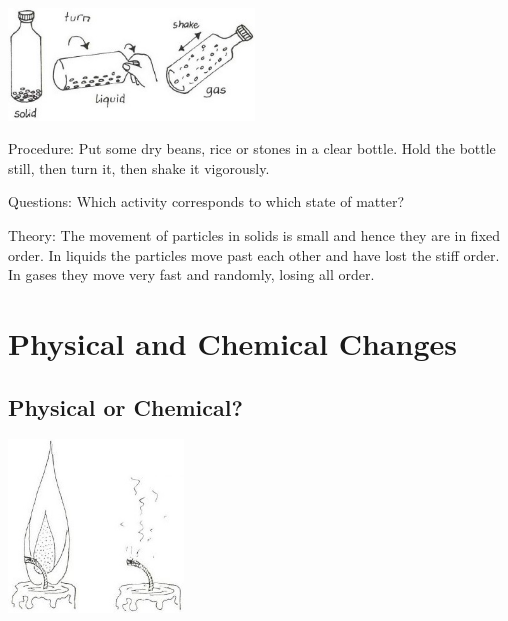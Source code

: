 \begin{multicols}{2}
\begin{center}
\includegraphics[width=0.49\textwidth]{./img/vso/motion-model.jpg}
\end{center}

\begin{description*}
\item[Procedure:]{Put some dry beans, rice or stones in a clear bottle. Hold the bottle still, then turn it, then shake it vigorously.}
\item[Questions:]{Which activity corresponds to which state of matter?}
\item[Theory:]{The movement of particles in solids is small and hence they are in fixed order. In liquids the particles move past each other and have lost the stiff order. In gases they move very fast and randomly, losing all order.}
\end{description*}


\section*{Physical and Chemical Changes}  


\subsection{Physical or Chemical?}

\begin{center}
\includegraphics[width=0.35\textwidth]{./img/source/physical-change.jpg}
\end{center}


\end{multicols}
